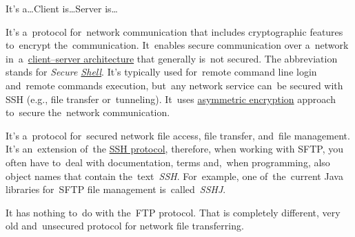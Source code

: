 \label{clientserverarchitecture}
\newline\todo It's a\dots Client is\dots Server is\dots

\label{tcpip}


\label{tcp}

\label{ip}

\label{http}

\label{smtp}

\label{ssh}
It's a~protocol for~network communication that includes cryptographic features to~encrypt the~communication.
It~enables secure communication over a~network in~a~\hyperref[clientserverarchitecture]{client--server architecture} that generally is~not secured.
The abbreviation stands for \textit{Secure \hyperref[shellcligui]{Shell}}.
It's typically used for~remote command line login and~remote commands execution, but~any network service can~be secured with SSH (e.g., file transfer or~tunneling).
It~uses \hyperref[asymmetricencryption]{asymmetric encryption} approach to~secure the~network communication.

\label{sftp}
It's a~protocol for~secured network file access, file transfer, and~file management.
It's an~extension of~the \hyperref[ssh]{SSH protocol}, therefore, when working with SFTP, you often have to~deal with documentation, terms and,~when programming, also object names that contain the~text~\textit{SSH}.
For~example, one of~the~current Java libraries for~SFTP file management is~called~\textit{SSHJ}.

\warning It has nothing to~do with the~FTP protocol.
That is completely different, very old and~unsecured protocol for network file transferring.

